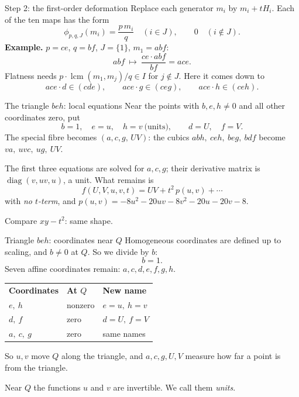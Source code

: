 \begin{frame}{Step 2: the first-order deformation}
Replace each generator \(m_i\) by \(m_i+tH_i\). Each of the ten maps has the form
\[
\phi_{p,q,J}(m_i)=\frac{p\,m_i}{q}\quad(i\in J),\qquad 0\quad(i\notin J).
\]
\textbf{Example.} \(p=ce\), \(q=bf\), \(J=\{1\}\), \(m_1=abf\):
\[
\boxed{abf\ \longmapsto\ \frac{ce\cdot abf}{bf}=ace.}
\]
Flatness needs \(p\cdot\operatorname{lcm}(m_1,m_j)/q\in I\) for \(j\notin J\). Here it comes down to
\[
ace\cdot d\in(cde),\qquad ace\cdot g\in(ceg),\qquad ace\cdot h\in(ceh).
\]
\end{frame}
\begin{frame}{The triangle \(beh\): local equations}
Near the points with \(b,e,h\ne0\) and all other coordinates zero, put
\[
b=1,\quad e=u,\quad h=v\ \text{(units)},\qquad d=U,\quad f=V.
\]
The special fibre becomes \((a,c,g,\,UV)\): the cubics \(abh,\ ceh,\ beg,\ bdf\) become \(va,\ uvc,\ ug,\ UV\).
\par\medskip
The first three equations are solved for \(a,c,g\); their derivative matrix is \(\operatorname{diag}(v,uv,u)\), a unit. What remains is
\[
\boxed{f(U,V,u,v,t)=UV+t^2\,p(u,v)+\cdots}
\]
with \emph{no \(t\)-term}, and \(p(u,v)=-8u^2-20uv-8v^2-20u-20v-8\).
\par\medskip
Compare \(xy-t^2\): same shape.
\end{frame}
\begin{frame}{Triangle \(beh\): coordinates near \(Q\)}
Homogeneous coordinates are defined up to scaling, and \(b\ne0\) at \(Q\). So we divide by \(b\):
\[
b=1.
\]
Seven affine coordinates remain: \(a,c,d,e,f,g,h\).
\par\medskip
\begin{center}
\begin{tabular}{lll}
\textbf{Coordinates}&\textbf{At \(Q\)}&\textbf{New name}\\[3pt]
\(e,\ h\)&nonzero&\(e=u,\ h=v\)\\[3pt]
\(d,\ f\)&zero&\(d=U,\ f=V\)\\[3pt]
\(a,\ c,\ g\)&zero&same names
\end{tabular}
\end{center}
\par\medskip
So \(u,v\) move \(Q\) along the triangle, and \(a,c,g,U,V\) measure how far a point is from the triangle.
\par\medskip
Near \(Q\) the functions \(u\) and \(v\) are invertible. We call them \emph{units}.
\end{frame}

